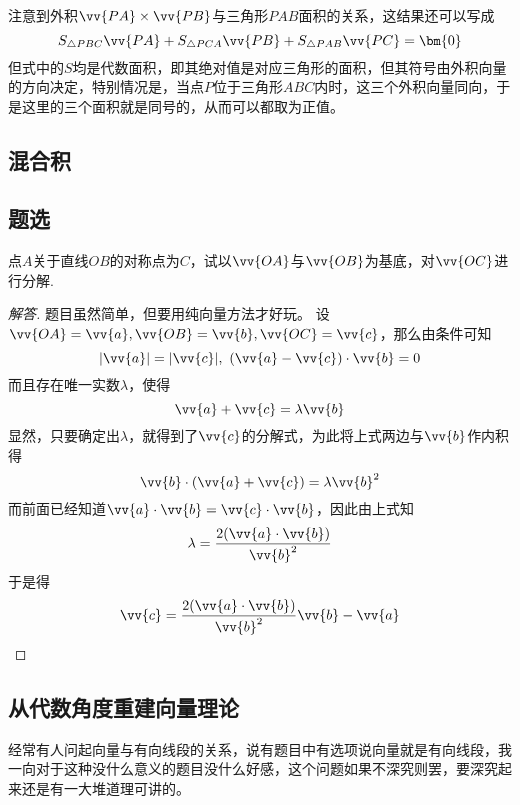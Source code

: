 \begin{example}
  注意到外积$\vv{PA}\times\vv{PB}$与三角形$PAB$面积的关系，这结果还可以写成
  \[ S_{\triangle PBC} \vv{PA} + S_{\triangle PCA} \vv{PB} + S_{\triangle PAB} \vv{PC} = \bm{0} \]
  但式中的$S$均是代数面积，即其绝对值是对应三角形的面积，但其符号由外积向量的方向决定，特别情况是，当点$P$位于三角形$ABC$内时，这三个外积向量同向，于是这里的三个面积就是同号的，从而可以都取为正值。
\end{example}

\subsection{混合积}
\label{sec:mixture-product-of-vector}



\subsection{题选}
\label{sec:题选}

\begin{exercise}
  点$A$关于直线$OB$的对称点为$C$，试以$\vv{OA}$与$\vv{OB}$为基底，对$\vv{OC}$进行分解.
\end{exercise}



\begin{proof}[解答]
  题目虽然简单，但要用纯向量方法才好玩。
设$\vv{OA}=\vv{a},\vv{OB}=\vv{b},\vv{OC}=\vv{c}$，那么由条件可知
\[ |\vv{a}|=|\vv{c}|, \  (\vv{a}-\vv{c}) \cdot \vv{b}=0 \]
而且存在唯一实数$\lambda$，使得
\[ \vv{a}+\vv{c}=\lambda \vv{b} \]
显然，只要确定出$\lambda$，就得到了$\vv{c}$的分解式，为此将上式两边与$\vv{b}$作内积得
\[ \vv{b} \cdot (\vv{a}+\vv{c})=\lambda \vv{b}^2 \]
而前面已经知道$\vv{a} \cdot \vv{b}=\vv{c} \cdot \vv{b}$，因此由上式知
\[ \lambda = \frac{2(\vv{a} \cdot \vv{b})}{\vv{b}^2} \]
于是得
\[ \vv{c} = \frac{2(\vv{a} \cdot \vv{b})}{\vv{b}^2} \vv{b} - \vv{a} \]
\end{proof}

\subsection{从代数角度重建向量理论}
\label{sec:algebra-vector}

经常有人问起向量与有向线段的关系，说有题目中有选项说向量就是有向线段，我一向对于这种没什么意义的题目没什么好感，这个问题如果不深究则罢，要深究起来还是有一大堆道理可讲的。

